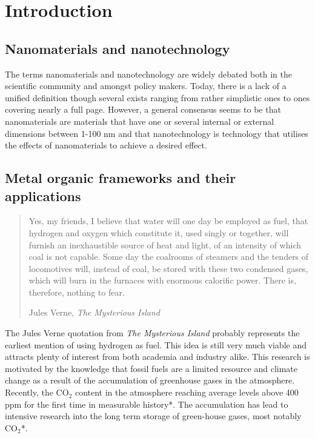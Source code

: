 \chapter{Introduction}
\raggedright

\section{Nanomaterials and nanotechnology}
The terms nanomaterials and nanotechnology are widely debated both in the scientific community and amongst policy makers. Today, there is a lack of a unified definition though several exists ranging from rather simplistic ones to ones covering nearly a full page. However, a general consensus seems to be that nanomaterials are materials that have one or several internal or external dimensions between 1-100 nm and that nanotechnology is technology that utilises the effects of nanomaterials to achieve a desired effect.

\section{Metal organic frameworks and their applications}

\begin{quotation}

Yes, my friends, I believe that water will one day be employed as fuel,
that hydrogen and oxygen which constitute it, used singly or together, will
furnish an inexhaustible source of heat and light, of an intensity of which
coal is not capable. Some day the coalrooms of steamers and the tenders of
locomotives will, instead of coal, be stored with these two condensed
gases, which will burn in the furnaces with enormous calorific power. There
is, therefore, nothing to fear. 

\raggedleft
Jules Verne, \emph{The Mysterious Island}\cite{vernemysterious}
\end{quotation}

The Jules Verne quotation from \emph{The Mysterious Island}  probably  represents the earliest mention of using hydrogen as fuel. This idea is still very much viable and attracts plenty of interest from both academia and industry alike\supercite{Nicoletti95,VandenBerg08}. This research is motivated by the knowledge that fossil fuels are a limited resource and climate change as a result of the accumulation of greenhouse gases in the atmosphere. Recently, the CO$_2$ content in the atmosphere reaching average levels above 400 ppm for the first time in measurable history*. The accumulation has lead to intensive research into the long term storage of green-house gases, most notably CO$_2$*.


